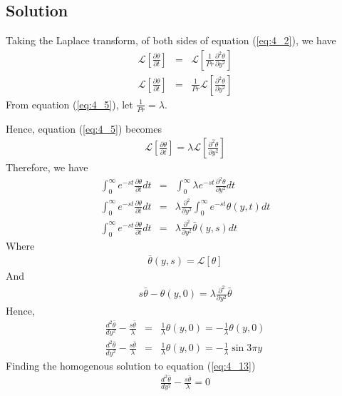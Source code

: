 \documentclass[11pt]{report}
\newcommand{\sps}{\\[0.2cm]}
\newcommand{\spn}[1]{\\[#1cm]}
\newcommand{\refn}[1]{(\ref{#1})}
\newcommand{\refx}[1]{\refn{eq:#1}}
\newcommand{\NI}{\noindent}
\newcommand{\dsp}{\displaystyle}
\newcommand{\Laplace}{\mathcal{L}}
\newcommand{\sbracket}[1]{\left[#1\right]}
\newcommand{\LFn}[1]{\Laplace \sbracket{#1}}
\begin{document}
	\subsection*{Solution}
	Taking the Laplace transform, of both sides of equation \refx{4_2}, we have
	\begin{eqnarray}
		\LFn{\frac{\partial\theta}{\partial t}} &=& \LFn{\frac{1}{Pr}\frac{\partial^2 \theta}{\partial y^2}}\label{eq:4_4}\sps
		\LFn{\frac{\partial\theta}{\partial t}} &=& \frac{1}{Pr}\LFn{\frac{\partial^2 \theta}{\partial y^2}}\label{eq:4_5}
	\end{eqnarray}
	From equation \refx{4_5}, let $\dsp \frac{1}{Pr} = \lambda$.
	
	\NI Hence, equation \refx{4_5} becomes
	\begin{eqnarray}
		\LFn{\frac{\partial\theta}{\partial t}} = \lambda\LFn{\frac{\partial^2 \theta}{\partial y^2}}\label{eq:4_6}
	\end{eqnarray}
	Therefore, we have
	\begin{eqnarray}
		\int_0^\infty e^{-st}\frac{\partial \theta}{\partial t}dt &=& \int_0^\infty \lambda e^{-st}\frac{\partial^2 \theta}{\partial y^2}dt\label{eq:4_7}\spn{0.3}
		\int_0^\infty e^{-st}\frac{\partial \theta}{\partial t}dt &=& \lambda\frac{\partial^2}{\partial y^2}\int_0^\infty e^{-st}\theta(y,t)dt\label{eq:4_8}\spn{0.5} 
		\int_0^\infty e^{-st}\frac{\partial \theta}{\partial t}dt &=& \lambda\frac{\partial^2}{\partial y^2}\bar{\theta}(y,s)dt\label{eq:4_9}
	\end{eqnarray}
	Where
	\begin{eqnarray}
		\bar{\theta}(y,s) = \LFn{\theta}\label{eq:4_10}
	\end{eqnarray}
	And
	\begin{eqnarray}
		s\bar{\theta} - \theta(y,0) = \lambda\frac{\partial^2}{\partial y^2}\bar{\theta}\label{eq:4_11}
	\end{eqnarray}
	Hence,
	\begin{eqnarray}
		\frac{d^2 \bar{\theta}}{d y^2} - \frac{s\bar{\theta}}{\lambda} &=& \frac{1}{\lambda}\theta(y,0) =  -  \frac{1}{\lambda}\theta(y,0)\sps
		\frac{d^2 \bar{\theta}}{d y^2} - \frac{s\bar{\theta}}{\lambda} &=& \frac{1}{\lambda}\theta(y,0) =  -  \frac{1}{\lambda}\sin 3\pi y\label{eq:4_13}
	\end{eqnarray}
	Finding the homogenous solution to equation \refx{4_13}
	\begin{eqnarray}
		\frac{d^2 \bar{\theta}}{d y^2} - \frac{s\bar{\theta}}{\lambda} = 0 \label{eq:4_14}
	\end{eqnarray}
\end{document}
